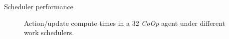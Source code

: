 \documentclass[aspectratio=169,xcolor={dvipsnames}
,handout
]{beamer}
\newcommand{\Coopfw}{\emph{CoOp}}
\begin{document}
\begin{frame}{Scheduler performance}
	\begin{figure}
		\caption{Action/update compute times in a \SI{32}{\bit} \Coopfw{} agent under different work schedulers.\label{fig:work-alloc-32}}
	\end{figure}
\end{frame}
\end{document}
